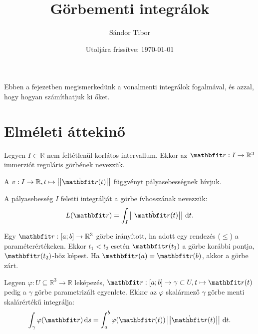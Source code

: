 \documentclass[lang=magyar]{math-handout}
\title{Görbementi integrálok}
\date{Utoljára frissítve: \today}
\author{Sándor Tibor}
\begin{document}
\allowdisplaybreaks

\maketitle

\vspace{1em}

\begin{summary}
  Ebben a fejezetben megismerkedünk a vonalmenti integrálok fogalmával, és
  azzal, hogy hogyan számíthatjuk ki őket.
\end{summary}

\vspace{-1em}

\section{Elméleti áttekinő}

\vspace{1em}

\begin{definition}
  Legyen $I \subset \mathbb R$ nem feltétlenül korlátos intervallum. Ekkor az
  $\rvec r : I \rightarrow \mathbb R^3$ immerziót reguláris görbének nevezzük.
\end{definition}

\begin{definition}
  A $v: I \rightarrow \mathbb R, t \mapsto \norma{\dot{\rvec r}(t)}$
  függvényt pályasebességnek hívjuk.

  A pályasebesség $I$ feletti integrálját a görbe ívhosszának nevezzük:
  \[
    L(\rvec r) = \int_I \norma{\dot{\rvec r}(t)} \, \diff t
    \text.
  \]

\end{definition}

\vfill

\begin{definition}
  Egy $\rvec r: [a;b] \rightarrow \mathbb R^3$ görbe irányított, ha adott egy
  rendezés ($\leq$) a paraméterértékeken. Ekkor $t_1 < t_2$ esetén
  $\rvec r(t_1)$ a görbe korábbi pontja, $\rvec r(t_2)$-höz képest. Ha
  $\rvec r(a) = \rvec r(b)$, akkor a görbe zárt.
\end{definition}

\vfill

\begin{definition}
  Legyen $\varphi: U \subseteq \mathbb R^3 \rightarrow \mathbb R$ leképezés,
  $\rvec r: [a;b] \rightarrow \gamma \subset U, t \mapsto \rvec r(t)$ pedig a
  $\gamma$ görbe parametrizált egyenlete. Ekkor az $\varphi$ skalármező $\gamma$
  görbe menti skalárértékű integrálja:
  \[
    \int_\gamma \varphi(\rvec r) \, \diff s =
    \int_a^b \varphi(\rvec r(t)) \norma{\dot{\rvec r}(t)} \, \diff t
    \text.
  \]
\end{definition}
\end{document}
